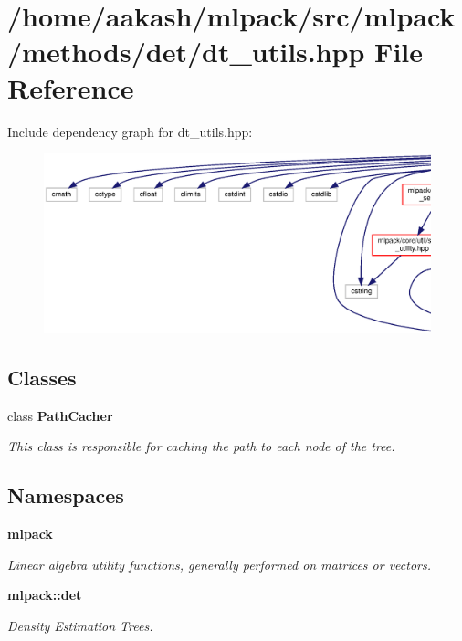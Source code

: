 \section{/home/aakash/mlpack/src/mlpack/methods/det/dt\+\_\+utils.hpp File Reference}
\label{dt__utils_8hpp}
Include dependency graph for dt\+\_\+utils.\+hpp\+:
\nopagebreak
\begin{figure}[H]
\begin{center}
\leavevmode
\includegraphics[width=350pt]{dt__utils_8hpp__incl}
\end{center}
\end{figure}
\subsection*{Classes}
\begin{DoxyCompactItemize}
\item 
class \textbf{ Path\+Cacher}
\begin{DoxyCompactList}\small\item\em This class is responsible for caching the path to each node of the tree. \end{DoxyCompactList}\end{DoxyCompactItemize}
\subsection*{Namespaces}
\begin{DoxyCompactItemize}
\item 
 \textbf{ mlpack}
\begin{DoxyCompactList}\small\item\em Linear algebra utility functions, generally performed on matrices or vectors. \end{DoxyCompactList}\item 
 \textbf{ mlpack\+::det}
\begin{DoxyCompactList}\small\item\em Density Estimation Trees. \end{DoxyCompactList}\end{DoxyCompactItemize}
